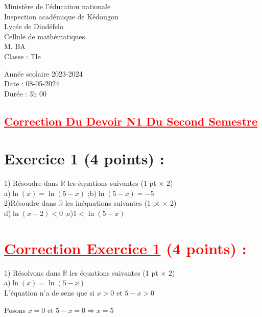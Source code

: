 \documentclass[12pt]{article}
\begin{document}
\begin{minipage}{0.5\textwidth}
	Ministère de l'éducation nationale  \\
	Inspection académique de Kédougou   \\
	Lycée de Dindéfelo            \\
	Cellule de mathématiques            \\
	M. BA                          \\
	Classe : Tle  \\
\end{minipage}
\begin{minipage}{0.5\textwidth}
	Année scolaire 2023-2024 \\
	Date : 08-05-2024 \\
	Durée : 3h 00 \\
\end{minipage}

\begin{center}
	\section*{\textcolor{red}{\underline{Correction Du Devoir N1 Du Second Semestre}}}
\end{center}

\section*{Exercice 1 (4 points) :}
1) Résoudre dans $\mathbb{R}$ les équations suivantes  (1 pt $\times$ 2)\\
a)$\ln(x) = \ln(5-x)$ ;\quad\quad  b)$\ln(5-x)=-5$ \\
2)Résoudre dans $\mathbb{R}$ les inéquations suivantes (1 pt $\times$ 2)\\
d)$\ln(x-2)<0$ ;\quad\quad e)$1<\ln(5-x)$
\section*{\textcolor{red}{\underline{Correction Exercice 1} (4 points) :}}
1) Résolvons dans $\mathbb{R}$ les équations suivantes  (1 pt $\times$ 2)\\
a)$\ln(x) = \ln(5-x)$\\
L'équation n'a de sens que si $x>0$ et $5-x>0$

Posons $x=0$ et $5-x=0 \Rightarrow x=5$
\end{document}
